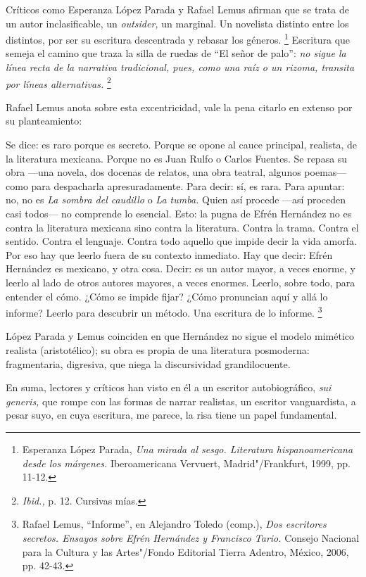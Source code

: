 \documentclass[14pt,twoside,final]{extbook} %
\let\oldfootnote\footnote
\renewcommand\footnote[1]{%
\oldfootnote{\hspace{1mm}#1}}
\begin{document}
Críticos como Esperanza López Parada y Rafael Lemus afirman que se trata de un autor inclasificable, un \emph{outsider,} un marginal. Un novelista distinto entre los distintos, por ser su escritura descentrada y rebasar los géneros.\footnote{Esperanza López Parada, \emph{Una mirada al sesgo. Literatura hispanoamericana desde los márgenes.} Iberoamericana Vervuert, Madrid"/Frankfurt, 1999, pp. 11-12.} Escritura que semeja el camino que traza la silla de ruedas de ``El señor de palo'': \emph{no sigue la línea recta de la narrativa tradicional, pues, como una raíz o un rizoma, transita por líneas alternativas.}\footnote{\emph{Ibid.,} p. 12. Cursivas mías.}

Rafael Lemus anota sobre esta excentricidad, vale la pena citarlo en extenso por su planteamiento:\protect\enlargethispage*{\baselineskip}
\begin{quoting}
Se dice: es raro porque es secreto. Porque se opone al cauce principal, realista, de la literatura mexicana. Porque no es Juan Rulfo o Carlos Fuentes. Se repasa su obra ---una novela, dos docenas de
relatos, una obra teatral, algunos poemas--- como para despacharla apresuradamente. Para decir: sí, es rara. Para apuntar: no, no es \emph{La sombra del caudillo} o \emph{La tumba.} Quien así procede ---así proceden casi todos--- no comprende lo esencial. Esto: la pugna de Efrén Hernández no es contra la literatura mexicana sino contra la literatura. Contra la trama. Contra el sentido. Contra el lenguaje. Contra todo aquello que impide decir la vida amorfa. Por eso hay que leerlo fuera de su contexto inmediato. Hay que decir: Efrén Hernández es mexicano, y otra cosa. Decir: es un autor mayor, a veces enorme, y leerlo al lado de otros autores mayores, a veces enormes. Leerlo, sobre todo, para entender el cómo. ¿Cómo se impide fijar? ¿Cómo pronuncian aquí y allá lo informe? Leerlo para descubrir un método. Una escritura de lo informe.\footnote{Rafael Lemus, ``Informe'', en Alejandro Toledo (comp.), \emph{Dos escritores secretos. Ensayos sobre Efrén Hernández y Francisco Tario.} Consejo Nacional para la Cultura y las Artes"/Fondo Editorial Tierra Adentro, México, 2006, pp. 42-43.}
\end{quoting}
López Parada y Lemus coinciden en que Hernández no sigue el modelo mimético realista (aristotélico); su obra es propia de una literatura posmoderna: fragmentaria, digresiva, que niega la discursividad grandilocuente.

En suma, lectores y críticos han visto en él a un escritor autobiográfico, \emph{sui generis,} que rompe con las formas de narrar realistas, un escritor vanguardista, a pesar suyo, en cuya escritura, me parece, la risa tiene un papel fundamental.
\end{document}
